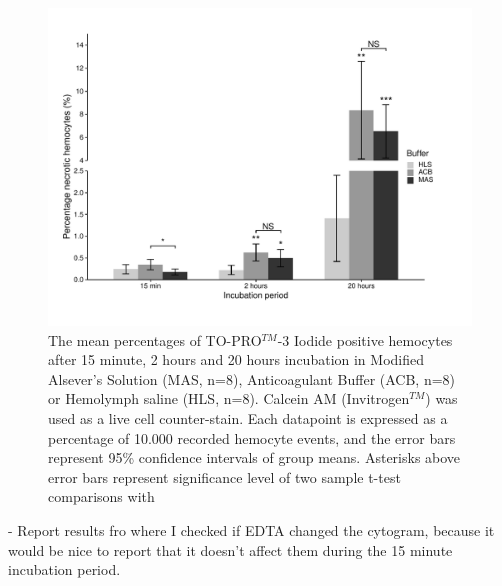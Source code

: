 \begin{figure}[!ht]
    \centering
    \includegraphics[width=1.0\textwidth]{figures/Method development/Buffer viability bargraph final.pdf}
    \caption{The mean percentages of TO-PRO$^{TM}$-3 Iodide positive hemocytes after 15 minute, 2 hours and 20 hours incubation in Modified Alsever's Solution (MAS, n=8), Anticoagulant Buffer (ACB, n=8) or Hemolymph saline (HLS, n=8). Calcein AM (Invitrogen$^{TM}$) was used as a live cell counter-stain. Each datapoint is expressed as a percentage of 10.000 recorded hemocyte events, and the error bars represent 95\% confidence intervals of group means. Asterisks above error bars represent significance level of two sample t-test comparisons with }
    \label{fig:BufferViability}
\end{figure}

- Report results fro where I checked if EDTA changed the cytogram, because it would be nice to report that it doesn't affect them during the 15 minute incubation period.